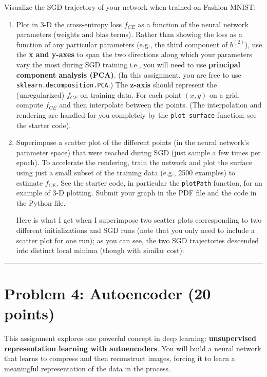 \documentclass[
  letterpaper,
  DIV=11,
  numbers=noendperiod]{scrartcl}
\begin{document}
Visualize the SGD trajectory of your network when trained on Fashion
MNIST:

\begin{enumerate}
\def\labelenumi{\arabic{enumi}.}
\item
  Plot in 3-D the cross-entropy loss \(f_{CE}\) as a function of the
  neural network parameters (weights and bias terms). Rather than
  showing the loss as a function of any particular parameters (e.g., the
  third component of \(b^{(2)}\)), use the \textbf{x and y-axes} to span
  the two directions along which your parameters vary the most during
  SGD training i.e., you will need to use \textbf{principal component
  analysis (PCA)}. (In this assignment, you are free to use
  \texttt{sklearn.decomposition.PCA}.) The \textbf{z-axis} should
  represent the (unregularized) \(f_{CE}\) on training data. For each
  point \((x,y)\) on a grid, compute \(f_{CE}\) and then interpolate
  between the points. (The interpolation and rendering are handled for
  you completely by the \texttt{plot\_surface} function; see the starter
  code).
\item
  Superimpose a scatter plot of the different points (in the neural
  network's parameter space) that were reached during SGD (just sample a
  few times per epoch). To accelerate the rendering, train the network
  and plot the surface using just a small subset of the training data
  (e.g., 2500 examples) to estimate \(f_{CE}\). See the starter code, in
  particular the \texttt{plotPath} function, for an example of 3-D
  plotting. Submit your graph in the PDF file and the code in the Python
  file.

  Here is what I get when I superimpose two scatter plots corresponding
  to two different initializations and SGD runs (note that you only need
  to include a scatter plot for one run); as you can see, the two SGD
  trajectories descended into distinct local minima (though with similar
  cost):
\end{enumerate}

\begin{center}\rule{0.5\linewidth}{0.5pt}\end{center}

\section{Problem 4: Autoencoder (20
points)}\label{problem-4-autoencoder-20-points}

This assignment explores one powerful concept in deep learning:
\textbf{unsupervised representation learning with autoencoders}. You
will build a neural network that learns to compress and then reconstruct
images, forcing it to learn a meaningful representation of the data in
the process.
\end{document}
